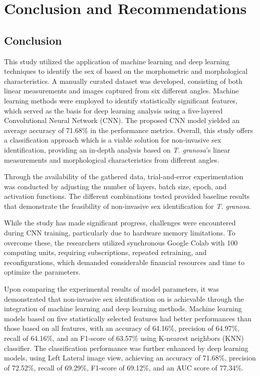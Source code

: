 \chapter{Conclusion and Recommendations}


\section{Conclusion}

This study utilized the application of machine learning and deep learning techniques to identify the sex of \Tgranosa based on the morphometric and morphological characteristics. A manually curated dataset was developed, consisting of both linear measurements and images captured from six different angles. Machine learning methods were employed to identify statistically significant features, which served as the basis for deep learning analysis using a five-layered Convolutional Neural Network (CNN). The proposed CNN model yielded an average accuracy of 71.68\% in the performance metrics. Overall, this study offers a classification approach which is a viable solution for non-invasive sex identification, providing an in-depth analysis based on \textit{T. granosa}’s linear measurements and morphological characteristics from different angles.

Through the availability of the gathered data, trial-and-error experimentation was conducted by adjusting the number of layers, batch size, epoch, and activation functions. The different combinations tested provided baseline results that demonstrate the feasibility of non-invasive sex identification for \textit{T. granosa}. 

While the study has made significant progress, challenges were encountered during CNN training, particularly due to hardware memory limitations. To overcome these, the researchers utilized synchronous Google Colab with 100 computing units, requiring subscriptions, repeated retraining, and reconfigurations, which demanded considerable financial resources and time to optimize the parameters. 

Upon comparing the experimental results of model parameters, it was demonstrated that non-invasive sex identification on \Tgranosa is achievable through the integration of machine learning and deep learning methods. Machine learning models based on five statistically selected features had better performances than those based on all features, with an accuracy of 64.16\%, precision of 64.97\%, recall of 64.16\%, and an F1-score of 63.57\% using K-nearest neighbors (KNN) classifier. The classification performance was further enhanced by deep learning models, using Left Lateral image view, achieving an accuracy of 71.68\%, precision of 72.52\%, recall of 69.29\%, F1-score of 69.12\%, and an AUC score of 77.34\%. 

